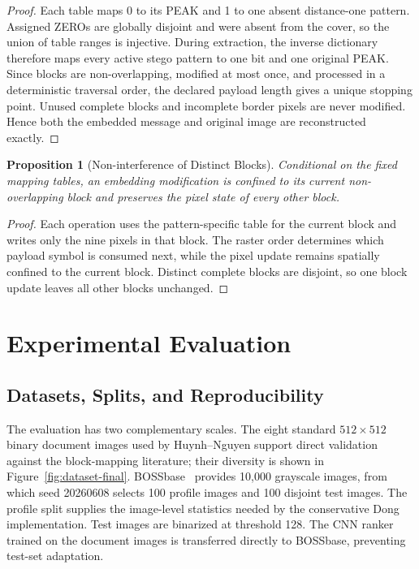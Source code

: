 \documentclass[a4paper,fleqn]{cas-dc}
\newtheorem{proposition}{Proposition}[section]
\newcommand{\RevisionAddBegin}{\begingroup\color{revisionblue}}
\newcommand{\RevisionAddEnd}{\endgroup}
\begin{document}
\begin{proof}
Each table maps 0 to its PEAK and 1 to one absent distance-one pattern.
Assigned ZEROs are globally disjoint and were absent from the cover, so the
union of table ranges is injective. During extraction, the inverse dictionary
therefore maps every active stego pattern to one bit and one original PEAK.
Since blocks are non-overlapping, modified at most once, and processed in a
deterministic traversal order, the declared payload length gives a unique
stopping point. Unused complete blocks and incomplete border pixels are never
modified. Hence both the embedded message and original image are reconstructed
exactly.
\end{proof}

\begin{proposition}[Non-interference of Distinct Blocks]
Conditional on the fixed mapping tables, an embedding modification is confined
to its current non-overlapping block and preserves the pixel state of every
other block.
\end{proposition}

\begin{proof}
\RevisionAddBegin
Each operation uses the pattern-specific table for the current block and writes
only the nine pixels in that block. The raster order determines which payload
symbol is consumed next, while the pixel update remains spatially confined to
the current block. Distinct complete blocks are disjoint, so one block update
leaves all other blocks unchanged.
\RevisionAddEnd
\end{proof}


\section{Experimental Evaluation}
\label{sec:experimental}

\subsection{Datasets, Splits, and Reproducibility}

The evaluation has two complementary scales. The eight standard
$512\times512$ binary document images used by Huynh--Nguyen
\cite{Huynh2025BlockMapping} support
direct validation against the block-mapping literature; their diversity is
shown in Figure~\ref{fig:dataset-final}. BOSSbase~\cite{Bas2011BOSS} provides
10,000 grayscale
images, from which seed 20260608 selects 100 profile images and 100 disjoint
\RevisionAddBegin
test images. The profile split supplies the image-level statistics needed by
the conservative Dong implementation. Test images are binarized at
\RevisionAddEnd
threshold 128. The CNN ranker trained on the document images is transferred
\RevisionAddBegin
directly to BOSSbase, preventing test-set adaptation.
\RevisionAddEnd
\end{document}
